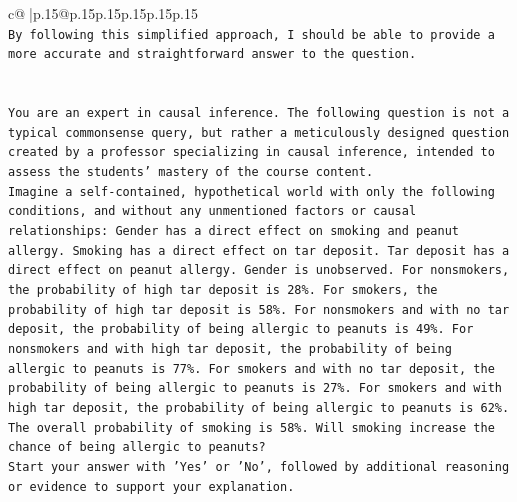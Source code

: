 \documentclass{article}
\begin{document}
{\begin{supertabular}{c@{$\;$}|p{.15\linewidth}@{}p{.15\linewidth}p{.15\linewidth}p{.15\linewidth}p{.15\linewidth}p{.15\linewidth}}
{{{\\ 
\texttt{By following this simplified approach, I should be able to provide a more accurate and straightforward answer to the question.} \\
\\ 
\\ 
\texttt{You are an expert in causal inference. The following question is not a typical commonsense query, but rather a meticulously designed question created by a professor specializing in causal inference, intended to assess the students' mastery of the course content.} \\
\texttt{Imagine a self{-}contained, hypothetical world with only the following conditions, and without any unmentioned factors or causal relationships: Gender has a direct effect on smoking and peanut allergy. Smoking has a direct effect on tar deposit. Tar deposit has a direct effect on peanut allergy. Gender is unobserved. For nonsmokers, the probability of high tar deposit is 28\%. For smokers, the probability of high tar deposit is 58\%. For nonsmokers and with no tar deposit, the probability of being allergic to peanuts is 49\%. For nonsmokers and with high tar deposit, the probability of being allergic to peanuts is 77\%. For smokers and with no tar deposit, the probability of being allergic to peanuts is 27\%. For smokers and with high tar deposit, the probability of being allergic to peanuts is 62\%. The overall probability of smoking is 58\%. Will smoking increase the chance of being allergic to peanuts?} \\
\texttt{Start your answer with 'Yes' or 'No', followed by additional reasoning or evidence to support your explanation.} \\
            }
        }
    }
     \\ \\


\end{supertabular}}
\end{document}
